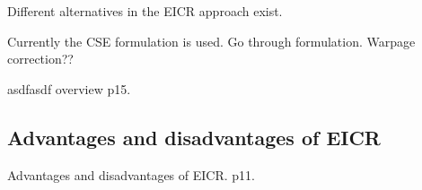 Different alternatives in the EICR approach exist. 

Currently the CSE formulation is used. Go through formulation. Warpage correction??





asdfasdf
overview \cite{felippa2000systematic} p15.



\subsection{Advantages and disadvantages of EICR}
Advantages and disadvantages of EICR. \cite{felippa2000systematic} p11.
